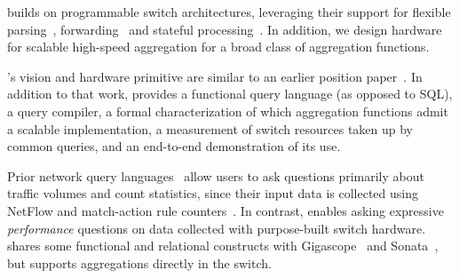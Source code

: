  \TheSystem builds on programmable switch
architectures, leveraging their support for flexible
parsing~\cite{gibb_parsing}, forwarding~\cite{rmt, openflow} and stateful
processing~\cite{domino_sigcomm}. In addition, we design hardware for scalable
high-speed aggregation for a broad class of aggregation functions.

\TheSystem's vision and hardware primitive are similar to an earlier
position paper~\cite{marple-hotnets}. In addition to that work, \TheSystem
provides a functional query language (as opposed to SQL), a query compiler, a
formal characterization of which aggregation functions admit a scalable
implementation, a measurement of switch resources taken up by common queries,
and an end-to-end demonstration of its use.



 Prior network query languages~\cite{gigascope,
frenetic, path_query, streaming-monitoring} allow users to ask questions
primarily about traffic volumes and count statistics, since their input data is
collected using NetFlow and match-action rule counters~\cite{openflow}. In
contrast, \TheSystem enables asking expressive {\em performance} questions on
data collected with purpose-built switch hardware. \TheSystem shares some
functional and relational constructs with Gigascope~\cite{gigascope} and
Sonata~\cite{streaming-monitoring}, but supports aggregations directly in the
switch.

